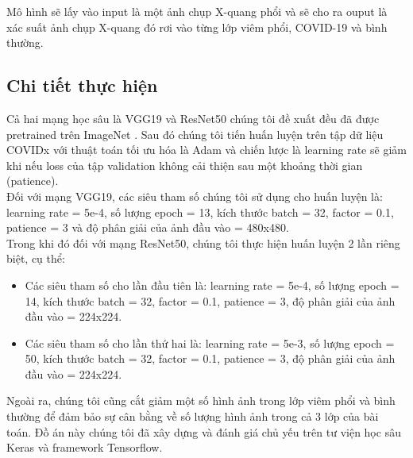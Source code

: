 \documentclass{article}
\begin{document}
Mô hình sẽ lấy vào input là một ảnh chụp X-quang phổi và sẽ cho ra ouput là xác suất ảnh chụp X-quang đó rơi vào từng lớp viêm phổi, COVID-19 và bình thường.

\subsection{Chi tiết thực hiện}
Cả hai mạng học sâu là VGG19 và ResNet50 chúng tôi đề xuất đều đã được pretrained trên ImageNet \cite{imagenet}. Sau đó chúng tôi tiến huấn luyện trên tập dữ liệu COVIDx với thuật toán tối ưu hóa là Adam và chiến lược là learning rate sẽ giảm khi nếu loss của tập validation không cải thiện sau một khoảng thời gian (patience).\\

Đối với mạng VGG19, các siêu tham số chúng tôi sử dụng cho huấn luyện là: learning rate = 5e-4, số lượng epoch = 13, kích thước batch = 32, factor = 0.1, patience = 3 và độ phân giải của ảnh đầu vào = 480x480.\\

Trong khi đó đối với mạng ResNet50, chúng tôi thực hiện huấn luyện 2 lần riêng biệt, cụ thể:
\begin{itemize}
    \item Các siêu tham số cho lần đầu tiên là: learning rate = 5e-4, số lượng epoch = 14, kích thước batch = 32, factor = 0.1, patience = 3, độ phân giải của ảnh đầu vào = 224x224.
    \item Các siêu tham số cho lần thứ hai là: learning rate = 5e-3, số lượng epoch = 50, kích thước batch = 32, factor = 0.1, patience = 3, độ phân giải của ảnh đầu vào = 224x224.
\end{itemize}

Ngoài ra, chúng tôi cũng cắt giảm một số hình ảnh trong lớp viêm phổi và bình thường để đảm bảo sự cân bằng về số lượng hình ảnh trong cả 3 lớp của bài toán. Đồ án này chúng tôi đã xây dựng và đánh giá chủ yếu trên tư viện học sâu Keras và framework Tensorflow.

\end{document}
